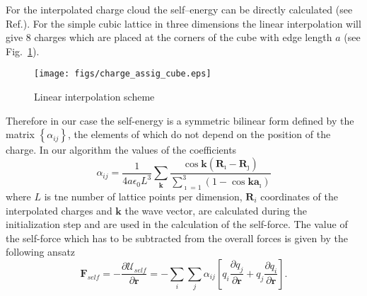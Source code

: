 \documentclass[a4paper, 12pt]{article}
\newcommand{\vect}[1]{\mathbf{#1}}
\begin{document}
For the interpolated charge cloud the self--energy can be directly
calculated (see Ref.\cite{phd_pasichnyk}). For the simple cubic
lattice in three dimensions the linear interpolation will give 8
charges which are placed at the corners of the cube with edge length
$a$ (see Fig.~\ref{fig:charge_assig_cubic_lattice}).
%
\begin{figure} 
  \centering \texttt{[image: figs/charge\_assig\_cube.eps]}
  \caption{Linear interpolation scheme} 
  \label{fig:charge_assig_cubic_lattice}  
\end{figure}
%
Therefore in our case the self-energy is a symmetric bilinear form
defined by the matrix $\left\{\alpha_{ij}\right\}$, the elements of
which do not depend on the position of the charge. In our algorithm
the values of the coefficients
%
\begin{equation}
  \alpha_{ij}=\frac{1}{4a\epsilon_0L^3}\sum\limits_{\vect k}\frac{\cos \vect k(\vect R_{\imath}-\vect R_{\jmath})}{\sum_{\imath=1}^3(1-\cos\vect
      k\vect a_{\imath})}
\end{equation}
%
where $L$ is tne number of lattice points per dimension, $\vect R_i$ coordinates of the interpolated charges and $\vect k$ the wave vector, are calculated during the initialization step and are used in the
calculation of the self-force. The value of the self-force which has
to be subtracted from the overall forces is given by the following
ansatz
%
\begin{equation}
  \vect F_{self}=-\frac{\partial \mathcal U_{self}}{\partial\vect
    r}=-\sum\limits_i\sum\limits_j\alpha_{ij}\left[q_i\frac{\partial
      q_j}{\partial\vect r}+q_j\frac{\partial q_i}{\partial\vect r}\right].
\end{equation}
%
%
\end{document}
